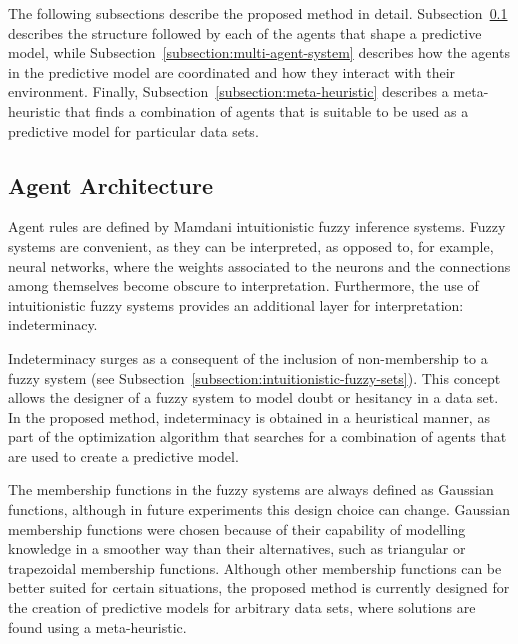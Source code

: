 \documentclass{ieeeaccess}
\begin{document}
The following subsections describe the proposed method in
detail. Subsection~\ref{subsection:agent-architecture} describes the structure
followed by each of the agents that shape a predictive model, while
Subsection~\ref{subsection:multi-agent-system} describes how the agents in the
predictive model are coordinated and how they interact with their
environment. Finally, Subsection~\ref{subsection:meta-heuristic} describes a
meta-heuristic that finds a combination of agents that is suitable to be used
as a predictive model for particular data sets.

\subsection{Agent Architecture}
\label{subsection:agent-architecture}

Agent rules are defined by Mamdani intuitionistic fuzzy inference systems. Fuzzy systems
are convenient, as they can be interpreted, as opposed to, for example, neural
networks, where the weights associated to the neurons and the connections among
themselves become obscure to interpretation. Furthermore, the use of
intuitionistic fuzzy systems provides an additional layer for interpretation:
indeterminacy.

Indeterminacy surges as a consequent of the inclusion of non-membership to a
fuzzy system (see Subsection~\ref{subsection:intuitionistic-fuzzy-sets}). This
concept allows the designer of a fuzzy system to model doubt or hesitancy in a
data set. In the proposed method, indeterminacy is obtained in a heuristical
manner, as part of the optimization algorithm that searches for a combination of
agents that are used to create a predictive model.

The membership functions in the fuzzy systems are always defined as Gaussian
functions, although in future experiments this design choice can
change. Gaussian membership functions were chosen because of their capability of
modelling knowledge in a smoother way than their alternatives, such as
triangular or trapezoidal membership functions. Although other membership
functions can be better suited for certain situations, the proposed method is
currently designed for the creation of predictive models for arbitrary data sets,
where solutions are found using a meta-heuristic.

\end{document}
